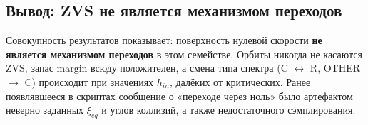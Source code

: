 \subsection{Вывод: ZVS не является механизмом переходов}
Совокупность результатов показывает: поверхность нулевой скорости \textbf{не является механизмом переходов} в этом семействе. Орбиты никогда не касаются ZVS, запас \(\text{margin}\) всюду положителен, а смена типа спектра (C \(\leftrightarrow\) R, OTHER \(\to\) C) происходит при значениях \(h_{in}\), далёких от критических. Ранее появлявшееся в скриптах сообщение о «переходе через ноль» было артефактом неверно заданных \(\xi_{eq}\) и углов коллизий, а также недостаточного сэмплирования.
